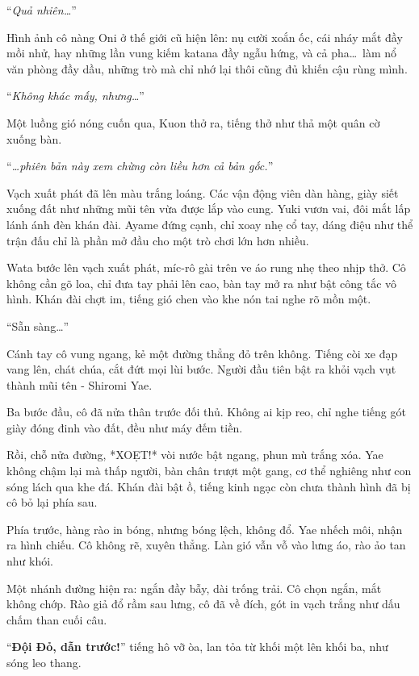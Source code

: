 \documentclass[../main.tex]{subfiles}
\begin{document}
``\textit{Quả nhiên\dots}''

Hình ảnh cô nàng Oni ở thế giới cũ hiện lên: nụ cười xoắn ốc, cái nháy mắt đầy mồi nhử, hay những lần vung kiếm katana đầy ngẫu hứng, và cả pha\dots\ làm nổ văn phòng đầy dầu, những trò mà chỉ nhớ lại thôi cũng đủ khiến cậu rùng mình.

``\textit{Không khác mấy, nhưng\dots}''

Một luồng gió nóng cuốn qua, Kuon thở ra, tiếng thở như thả một quân cờ xuống bàn.

``\textit{\dots phiên bản này xem chừng còn liều hơn cả bản gốc.}''

Vạch xuất phát đã lên màu trắng loáng. Các vận động viên dàn hàng, giày siết xuống đất như những mũi tên vừa được lắp vào cung. Yuki vươn vai, đôi mắt lấp lánh ánh đèn khán đài. Ayame đứng cạnh, chỉ xoay nhẹ cổ tay, dáng điệu như thể trận đấu chỉ là phần mở đầu cho một trò chơi lớn hơn nhiều.

\ct

Wata bước lên vạch xuất phát, míc-rô gài trên ve áo rung nhẹ theo nhịp thở. Cô không cần gõ loa, chỉ đưa tay phải lên cao, bàn tay mở ra như bật công tắc vô hình. Khán đài chợt im, tiếng gió chen vào khe nón tai nghe rõ mồn một.

``Sẵn sàng\dots''

Cánh tay cô vung ngang, kẻ một đường thẳng đỏ trên không. Tiếng còi xe đạp vang lên, chát chúa, cắt đứt mọi lùi bước. Người đầu tiên bật ra khỏi vạch vụt thành mũi tên - Shiromi Yae.

Ba bước đầu, cô đã nửa thân trước đối thủ. Không ai kịp reo, chỉ nghe tiếng gót giày đóng đinh vào đất, đều như máy đếm tiền.

Rồi, chỗ nửa đường, *XOẸT!* vòi nước bật ngang, phun mù trắng xóa. Yae không chậm lại mà thấp người, bàn chân trượt một gang, cơ thể nghiêng như con sóng lách qua khe đá. Khán đài bật ồ, tiếng kinh ngạc còn chưa thành hình đã bị cô bỏ lại phía sau.

Phía trước, hàng rào in bóng, nhưng bóng lệch, không đổ. Yae nhếch môi, nhận ra hình chiếu. Cô không rẽ, xuyên thẳng. Làn gió vẫn vỗ vào lưng áo, rào ảo tan như khói.

Một nhánh đường hiện ra: ngắn đầy bẫy, dài trống trải. Cô chọn ngắn, mắt không chớp. Rào giả đổ rầm sau lưng, cô đã về đích, gót in vạch trắng như dấu chấm than cuối câu.

``\textbf{Đội Đỏ, dẫn trước!}'' tiếng hô vỡ òa, lan tỏa từ khối một lên khối ba, như sóng leo thang.
\end{document}
